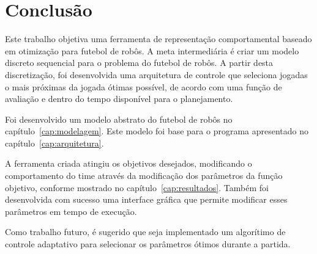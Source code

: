 \chapter*{Conclusão}\label{cap:conclusao}

Este trabalho objetiva uma ferramenta de representação
comportamental baseado em otimização para futebol de robôs.
A meta intermediária é criar um modelo discreto sequencial
para o problema do futebol de robôs. A partir desta
discretização, foi desenvolvida uma arquitetura de controle
que seleciona jogadas o mais próximas da jogada ótimas possível,
de acordo com uma função de avaliação e dentro do tempo disponível
para o planejamento.

Foi desenvolvido um modelo abstrato do futebol de robôs no
capítulo~\ref{cap:modelagem}. Este modelo foi base para o
programa apresentado no capítulo~\ref{cap:arquitetura}.

A ferramenta criada atingiu os objetivos desejados, modificando o
comportamento do time através da modificação dos parâmetros da função
objetivo, conforme mostrado no capítulo~\ref{cap:resultados}. Também foi
desenvolvida com sucesso uma interface gráfica que permite modificar
esses parâmetros em tempo de execução.

Como trabalho futuro, é sugerido que seja implementado 
um algorítimo de controle adaptativo para selecionar os
parâmetros ótimos durante a partida.

